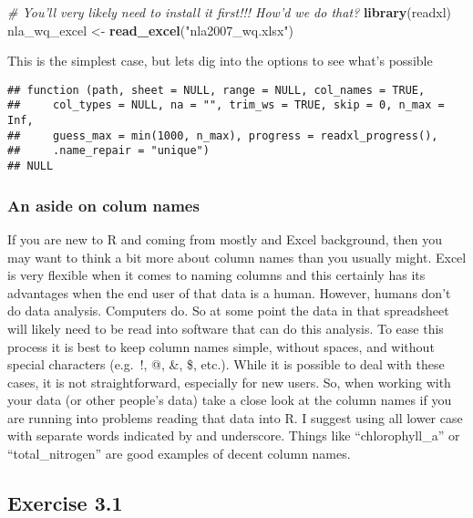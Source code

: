 \documentclass[]{article}
\newenvironment{Shaded}{\begin{snugshade}}{\end{snugshade}}
\newcommand{\CommentTok}[1]{\textcolor[rgb]{0.56,0.35,0.01}{\textit{#1}}}
\newcommand{\KeywordTok}[1]{\textcolor[rgb]{0.13,0.29,0.53}{\textbf{#1}}}
\newcommand{\NormalTok}[1]{#1}
\newcommand{\StringTok}[1]{\textcolor[rgb]{0.31,0.60,0.02}{#1}}
\begin{document}
\begin{Shaded}
\begin{Highlighting}[]
\CommentTok{# You'll very likely need to install it first!!!  How'd we do that?}
\KeywordTok{library}\NormalTok{(readxl)}
\NormalTok{nla_wq_excel <-}\StringTok{ }\KeywordTok{read_excel}\NormalTok{(}\StringTok{"nla2007_wq.xlsx"}\NormalTok{)}
\end{Highlighting}
\end{Shaded}

This is the simplest case, but lets dig into the options to see what's
possible

\begin{verbatim}
## function (path, sheet = NULL, range = NULL, col_names = TRUE, 
##     col_types = NULL, na = "", trim_ws = TRUE, skip = 0, n_max = Inf, 
##     guess_max = min(1000, n_max), progress = readxl_progress(), 
##     .name_repair = "unique") 
## NULL
\end{verbatim}

\hypertarget{an-aside-on-colum-names}{%
\subsubsection{An aside on colum names}\label{an-aside-on-colum-names}}

If you are new to R and coming from mostly and Excel background, then
you may want to think a bit more about column names than you usually
might. Excel is very flexible when it comes to naming columns and this
certainly has its advantages when the end user of that data is a human.
However, humans don't do data analysis. Computers do. So at some point
the data in that spreadsheet will likely need to be read into software
that can do this analysis. To ease this process it is best to keep
column names simple, without spaces, and without special characters
(e.g.~!, @, \&, \$, etc.). While it is possible to deal with these
cases, it is not straightforward, especially for new users. So, when
working with your data (or other people's data) take a close look at the
column names if you are running into problems reading that data into R.
I suggest using all lower case with separate words indicated by and
underscore. Things like ``chlorophyll\_a'' or ``total\_nitrogen'' are
good examples of decent column names.

\hypertarget{exercise-3.1}{%
\subsection{Exercise 3.1}\label{exercise-3.1}}
\end{document}
